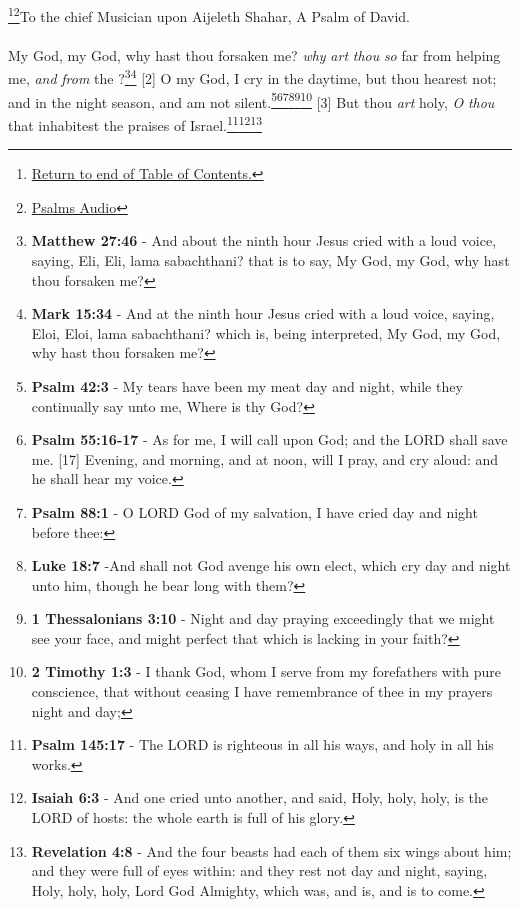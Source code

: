 \footnote{\textcolor[cmyk]{0.99998,1,0,0}{\hyperlink{TOC}{Return to end of Table of Contents.}}}\footnote{\href{https://www.audioverse.org/english/audiobibles/books/ENGKJV/O/Ps/1}{\textcolor[cmyk]{0.99998,1,0,0}{Psalms Audio}}}\textcolor[cmyk]{0.99998,1,0,0}{To the chief Musician upon Aijeleth Shahar, A Psalm of David.}\\
\\
\textcolor[cmyk]{0.99998,1,0,0}{My God, my God, why hast thou forsaken me? \emph{why} \emph{art} \emph{thou} \emph{so} far from helping me, \emph{and} \emph{from} the ?}\footnote{\textbf{Matthew 27:46} - And about the ninth hour Jesus cried with a loud voice, saying, Eli, Eli, lama sabachthani? that is to say, My God, my God, why hast thou forsaken me?}\footnote{\textbf{Mark 15:34} - And at the ninth hour Jesus cried with a loud voice, saying, Eloi, Eloi, lama sabachthani? which is, being interpreted, My God, my God, why hast thou forsaken me?}
[2] \textcolor[cmyk]{0.99998,1,0,0}{O my God, I cry in the daytime, but thou hearest not; and in the night season, and am not silent.}\footnote{\textbf{Psalm 42:3} - My tears have been my meat day and night, while they continually say unto me, Where is thy God?}\footnote{\textbf{Psalm 55:16-17} - As for me, I will call upon God; and the LORD shall save me. [17] Evening, and morning, and at noon, will I pray, and cry aloud: and he shall hear my voice.}\footnote{\textbf{Psalm 88:1} - O LORD God of my salvation, I have cried day and night before thee:}\footnote{\textbf{Luke 18:7} -And shall not God avenge his own elect, which cry day and night unto him, though he bear long with them?}\footnote{\textbf{1 Thessalonians 3:10} - Night and day praying exceedingly that we might see your face, and might perfect that which is lacking in your faith?}\footnote{\textbf{2 Timothy 1:3} - I thank God, whom I serve from my forefathers with pure conscience, that without ceasing I have remembrance of thee in my prayers night and day;}
[3] \textcolor[cmyk]{0.99998,1,0,0}{But thou \emph{art} holy, \emph{O} \emph{thou} that inhabitest the praises of Israel.}\footnote{\textbf{Psalm 145:17} - The LORD is righteous in all his ways, and holy in all his works.}\footnote{\textbf{Isaiah 6:3} - And one cried unto another, and said, Holy, holy, holy, is the LORD of hosts: the whole earth is full of his glory.}\footnote{\textbf{Revelation 4:8} - And the four beasts had each of them six wings about him; and they were full of eyes within: and they rest not day and night, saying, Holy, holy, holy, Lord God Almighty, which was, and is, and is to come.}
